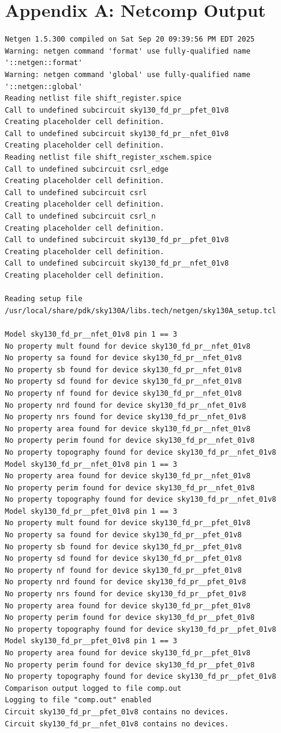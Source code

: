 \documentclass[11pt]{article}
\begin{document}
\section*{Appendix A: Netcomp Output}
\begin{lstlisting}
Netgen 1.5.300 compiled on Sat Sep 20 09:39:56 PM EDT 2025
Warning: netgen command 'format' use fully-qualified name '::netgen::format'
Warning: netgen command 'global' use fully-qualified name '::netgen::global'
Reading netlist file shift_register.spice
Call to undefined subcircuit sky130_fd_pr__pfet_01v8
Creating placeholder cell definition.
Call to undefined subcircuit sky130_fd_pr__nfet_01v8
Creating placeholder cell definition.
Reading netlist file shift_register_xschem.spice
Call to undefined subcircuit csrl_edge
Creating placeholder cell definition.
Call to undefined subcircuit csrl
Creating placeholder cell definition.
Call to undefined subcircuit csrl_n
Creating placeholder cell definition.
Call to undefined subcircuit sky130_fd_pr__pfet_01v8
Creating placeholder cell definition.
Call to undefined subcircuit sky130_fd_pr__nfet_01v8
Creating placeholder cell definition.

Reading setup file /usr/local/share/pdk/sky130A/libs.tech/netgen/sky130A_setup.tcl

Model sky130_fd_pr__nfet_01v8 pin 1 == 3
No property mult found for device sky130_fd_pr__nfet_01v8
No property sa found for device sky130_fd_pr__nfet_01v8
No property sb found for device sky130_fd_pr__nfet_01v8
No property sd found for device sky130_fd_pr__nfet_01v8
No property nf found for device sky130_fd_pr__nfet_01v8
No property nrd found for device sky130_fd_pr__nfet_01v8
No property nrs found for device sky130_fd_pr__nfet_01v8
No property area found for device sky130_fd_pr__nfet_01v8
No property perim found for device sky130_fd_pr__nfet_01v8
No property topography found for device sky130_fd_pr__nfet_01v8
Model sky130_fd_pr__nfet_01v8 pin 1 == 3
No property area found for device sky130_fd_pr__nfet_01v8
No property perim found for device sky130_fd_pr__nfet_01v8
No property topography found for device sky130_fd_pr__nfet_01v8
Model sky130_fd_pr__pfet_01v8 pin 1 == 3
No property mult found for device sky130_fd_pr__pfet_01v8
No property sa found for device sky130_fd_pr__pfet_01v8
No property sb found for device sky130_fd_pr__pfet_01v8
No property sd found for device sky130_fd_pr__pfet_01v8
No property nf found for device sky130_fd_pr__pfet_01v8
No property nrd found for device sky130_fd_pr__pfet_01v8
No property nrs found for device sky130_fd_pr__pfet_01v8
No property area found for device sky130_fd_pr__pfet_01v8
No property perim found for device sky130_fd_pr__pfet_01v8
No property topography found for device sky130_fd_pr__pfet_01v8
Model sky130_fd_pr__pfet_01v8 pin 1 == 3
No property area found for device sky130_fd_pr__pfet_01v8
No property perim found for device sky130_fd_pr__pfet_01v8
No property topography found for device sky130_fd_pr__pfet_01v8
Comparison output logged to file comp.out
Logging to file "comp.out" enabled
Circuit sky130_fd_pr__pfet_01v8 contains no devices.
Circuit sky130_fd_pr__nfet_01v8 contains no devices.


\end{lstlisting}
\end{document}
